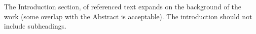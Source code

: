 The Introduction section, of referenced text\cite{Figueredo:2009dg} expands on the background of the work (some overlap with the Abstract is acceptable). The introduction should not include subheadings.